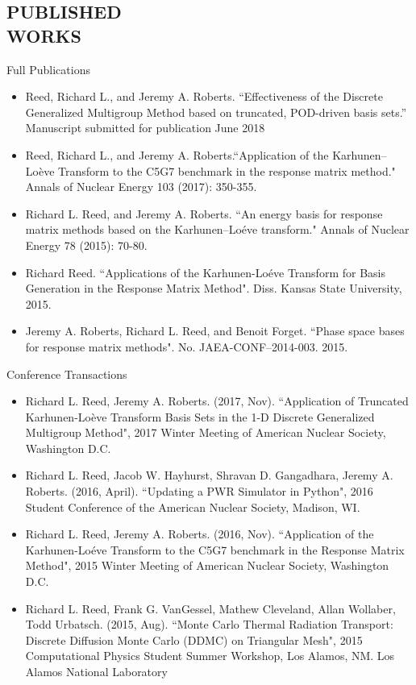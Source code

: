 \documentclass[margin, 10pt]{res} %
\begin{document}
\begin{resume}
\section{PUBLISHED \\ WORKS}
Full Publications
\begin{itemize}
\item Reed, Richard L., and Jeremy A. Roberts. ``Effectiveness of the Discrete Generalized Multigroup Method based on truncated, POD-driven basis sets.'' Manuscript submitted for publication June 2018
\item Reed, Richard L., and Jeremy A. Roberts.``Application of the Karhunen--Lo\`eve Transform to the C5G7 benchmark in the response matrix method." Annals of Nuclear Energy 103 (2017): 350-355.
\item Richard L. Reed, and Jeremy A. Roberts. ``An energy basis for response matrix methods based on the Karhunen–Loéve transform." Annals of Nuclear Energy 78 (2015): 70-80.
\item Richard Reed. ``Applications of the Karhunen-Loéve Transform for Basis Generation in the Response Matrix Method". Diss. Kansas State University, 2015.
\item Jeremy A. Roberts, Richard L. Reed, and Benoit Forget. ``Phase space bases for response matrix methods". No. JAEA-CONF--2014-003. 2015.
\end{itemize}
Conference Transactions
\begin{itemize}
\item Richard L. Reed, Jeremy A. Roberts. (2017, Nov). ``Application of Truncated Karhunen-Loève Transform Basis Sets in the 1-D Discrete Generalized Multigroup Method", 2017 Winter Meeting of American Nuclear Society, Washington D.C.
\item Richard L. Reed, Jacob W. Hayhurst, Shravan D. Gangadhara, Jeremy A. Roberts. (2016, April). ``Updating a PWR Simulator in Python", 2016 Student Conference of the American Nuclear Society, Madison, WI.
\item Richard L. Reed, Jeremy A. Roberts. (2016, Nov). ``Application of the Karhunen-Lo\'{e}ve Transform to the C5G7 benchmark in the Response Matrix Method", 2015 Winter Meeting of American Nuclear Society, Washington D.C.
\item Richard L. Reed, Frank G. VanGessel, Mathew Cleveland, Allan Wollaber, Todd Urbatsch. (2015, Aug). ``Monte Carlo Thermal Radiation
Transport: Discrete Diffusion Monte Carlo (DDMC) on Triangular Mesh", 2015 Computational Physics Student Summer Workshop, Los Alamos, NM. Los Alamos National Laboratory

\end{itemize}
\end{resume}
\end{document}
